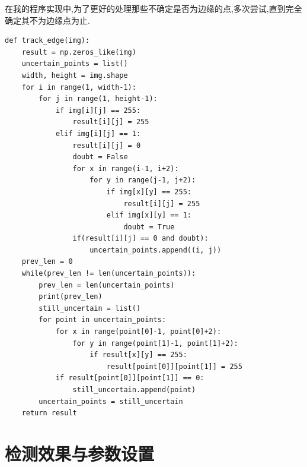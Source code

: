\documentclass[a4paper]{article}
\begin{document}
在我的程序实现中,为了更好的处理那些不确定是否为边缘的点,多次尝试,直到完全确定其不为边缘点为止.

\begin{verbatim}
def track_edge(img):
    result = np.zeros_like(img)
    uncertain_points = list()
    width, height = img.shape
    for i in range(1, width-1):
        for j in range(1, height-1):
            if img[i][j] == 255:
                result[i][j] = 255
            elif img[i][j] == 1:
                result[i][j] = 0
                doubt = False
                for x in range(i-1, i+2):
                    for y in range(j-1, j+2):
                        if img[x][y] == 255:
                            result[i][j] = 255
                        elif img[x][y] == 1:
                            doubt = True
                if(result[i][j] == 0 and doubt):
                    uncertain_points.append((i, j))
    prev_len = 0
    while(prev_len != len(uncertain_points)):
        prev_len = len(uncertain_points)
        print(prev_len)
        still_uncertain = list()
        for point in uncertain_points:
            for x in range(point[0]-1, point[0]+2):
                for y in range(point[1]-1, point[1]+2):
                    if result[x][y] == 255:
                        result[point[0]][point[1]] = 255
            if result[point[0]][point[1]] == 0:
                still_uncertain.append(point)
        uncertain_points = still_uncertain
    return result
\end{verbatim}

\newpage

\section{检测效果与参数设置}
\end{document}

